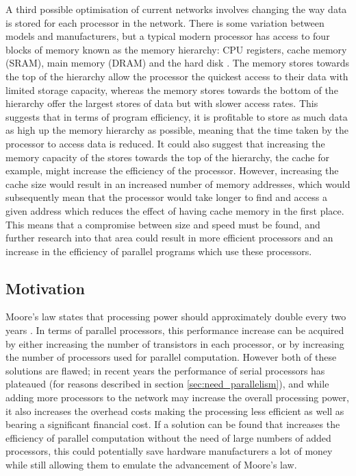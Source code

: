 \documentclass[a4paper, 12pt]{article}
\begin{document}
A third possible optimisation of current networks involves changing the way data is stored for each processor in the network. There is some variation between models and manufacturers, but a typical modern processor has access to four blocks of memory known as the memory hierarchy: CPU registers, cache memory (SRAM), main memory (DRAM) and the hard disk \cite{Toy86}. The memory stores towards the top of the hierarchy allow the processor the quickest access to their data with limited storage capacity, whereas the memory stores towards the bottom of the hierarchy offer the largest stores of data but with slower access rates. This suggests that in terms of program efficiency, it is profitable to store as much data as high up the memory hierarchy as possible, meaning that the time taken by the processor to access data is reduced. It could also suggest that increasing the memory capacity of the stores towards the top of the hierarchy, the cache for example, might increase the efficiency of the processor. However, increasing the cache size would result in an increased number of memory addresses, which would subsequently mean that the processor would take longer to find and access a given address which reduces the effect of having cache memory in the first place. This means that a compromise between size and speed must be found, and further research into that area could result in more efficient processors and an increase in the efficiency of parallel programs which use these processors. 

\subsection{Motivation}

Moore's law states that processing power should approximately double every two years \cite{Moo65}. In terms of parallel processors, this performance increase can be acquired by either increasing the number of transistors in each processor, or by increasing the number of processors used for parallel computation. However both of these solutions are flawed; in recent years the performance of serial processors has plateaued (for reasons described in section \ref{sec:need_parallelism}), and while adding more processors to the network may increase the overall processing power, it also increases the overhead costs making the processing less efficient as well as bearing a significant financial cost. If a solution can be found that increases the efficiency of parallel computation without the need of large numbers of added processors, this could potentially save hardware manufacturers a lot of money while still allowing them to emulate the advancement of Moore's law.
\end{document}
